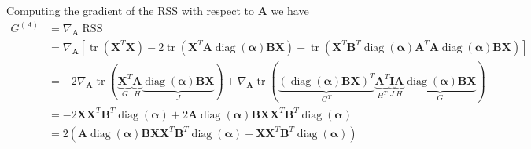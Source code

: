 \documentclass{article}
\begin{document}
Computing the gradient of the RSS with respect to $\mathbf{A}$ we have
\begin{equation}
    \label{eq:relaxed_objective_grad_A}
    \begin{aligned}
        G^{(A)} &= \nabla_{\mathbf{A}} \operatorname{RSS} \\
        &=\nabla_{\mathbf{A}}
        \left[
            \operatorname{tr}\left( \mathbf{X}^T \mathbf{X} \right)
            - 2 \operatorname{tr} \left( \mathbf{{X}}^T \mathbf{{A}} \operatorname{diag}(\boldsymbol{\alpha}) \mathbf{B} \mathbf{X} \right)
            + \operatorname{tr} \left( \mathbf{X}^T \mathbf{B}^T \operatorname{diag}(\boldsymbol{\alpha}) \mathbf{{A}}^T \mathbf{{A}} \operatorname{diag}(\boldsymbol{\alpha}) \mathbf{B} \mathbf{X} \right)
        \right] \\
        &= - 2 \nabla_{\mathbf{A}} \operatorname{tr}(\underbrace{\mathbf{X}^T}_{G} \underbrace{\mathbf{A}}_{H} \underbrace{\operatorname{diag}(\boldsymbol{\alpha}) \mathbf{B} \mathbf{X}}_{J})
            + \nabla_{\mathbf{A}} \operatorname{tr}(\underbrace{(\operatorname{diag}(\boldsymbol{\alpha}) \mathbf{B} \mathbf{X})^T}_{G^T} \underbrace{\mathbf{A}^T}_{H^T} \underbrace{\mathbf{I}}_{J} \underbrace{\mathbf{A}}_{H} \underbrace{\operatorname{diag}(\boldsymbol{\alpha}) \mathbf{B} \mathbf{X}}_{G}) \\
        &= - 2 \mathbf{X} \mathbf{X}^T \mathbf{B}^T \operatorname{diag}(\boldsymbol{\alpha}) + 2 \mathbf{A} \operatorname{diag}(\boldsymbol{\alpha}) \mathbf{B} \mathbf{X} \mathbf{X}^T \mathbf{B}^T \operatorname{diag}(\boldsymbol{\alpha}) \\
        &= 2 \left( \mathbf{A} \operatorname{diag}(\boldsymbol{\alpha}) \mathbf{B} \mathbf{X} \mathbf{X}^T \mathbf{B}^T \operatorname{diag}(\boldsymbol{\alpha}) - \mathbf{X} \mathbf{X}^T \mathbf{B}^T \operatorname{diag}(\boldsymbol{\alpha}) \right) \\
    \end{aligned}
\end{equation}
\end{document}
